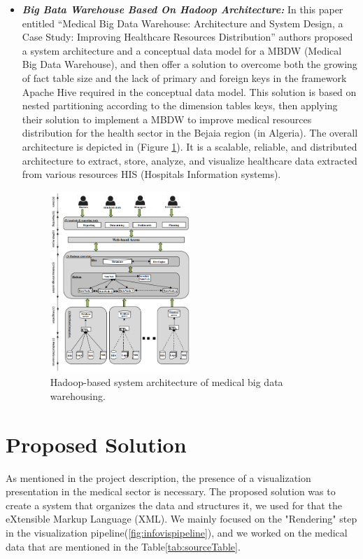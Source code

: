 \begin{itemize}
    \item \textbf{\textit{Big Bata Warehouse Based On Hadoop Architecture:}} In this paper\cite{sebaa2018medical} entitled “Medical Big Data Warehouse: Architecture and System Design, a Case Study: Improving Healthcare Resources Distribution” authors proposed a system architecture and a conceptual data model for a MBDW (Medical Big Data Warehouse), and then offer a solution to overcome both the growing of fact table size and the lack of primary and foreign keys in the framework Apache Hive required in the conceptual data model. This solution is based on nested partitioning according to the dimension tables keys, then  applying their solution to implement a MBDW to improve medical resources distribution for the health sector in the Bejaia region (in Algeria). 
    \newpage
    The overall architecture is depicted in (Figure \ref{fig:bigdatarelated}). It is a scalable, reliable, and distributed architecture to extract, store, analyze, and visualize healthcare data extracted from various resources HIS (Hospitals Information systems).
    \begin{figure}[h!]
      \center
      \includegraphics[width=0.50\textwidth]{images/chapter3/relatedworkHadoop.PNG}
      \caption{Hadoop-based system architecture of medical big data warehousing.}
      \label{fig:bigdatarelated}
    \end{figure}
\end{itemize}


\section{Proposed Solution}
As mentioned in the project description, the presence of a visualization presentation in the medical sector is necessary. The proposed solution was to create a system that organizes the data and structures it, we used for that the eXtensible Markup Language (XML).
We mainly focused on the "Rendering" step in the visualization pipeline(\ref{fig:infovispipeline}), and we worked on the medical data that are mentioned in the Table\ref{tab:sourceTable}.
\newpage

